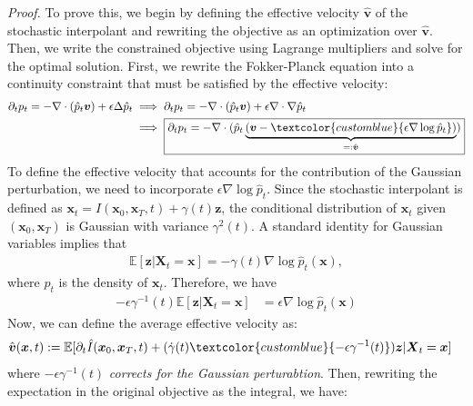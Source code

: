 \documentclass{article}
\newcommand{\bluetext}[1]{\textcolor{customblue}{#1}}
\begin{document}
\textit{Proof.} 
To prove this, we begin by defining the effective velocity $\hat{\boldsymbol{v}}$ of the stochastic interpolant and rewriting the objective as an optimization over $\hat{\boldsymbol{v}}$. Then, we write the constrained objective using Lagrange multipliers and solve for the optimal solution. First, we rewrite the Fokker-Planck equation into a continuity constraint that must be satisfied by the effective velocity:
\begin{align}
    \partial_tp_t=-\nabla \cdot(\hat{p}_t\boldsymbol{v})+\epsilon\Delta \hat{p}_t&\implies \partial_tp_t=-\nabla \cdot(\hat{p}_t\boldsymbol{v})+\epsilon\nabla \cdot\nabla  \hat{p}_t\nonumber\\
    &\implies\boxed{\partial_tp_t=-\nabla \cdot(\hat{p}_t\underbrace{(\boldsymbol{v}-\bluetext{\epsilon \nabla\log  \hat p_t})}_{=:\hat{\boldsymbol{v}}})}
\end{align}
To define the effective velocity that accounts for the contribution of the Gaussian perturbation, we need to incorporate $\epsilon \nabla\log  \hat p_t$. Since the stochastic interpolant is defined as $\boldsymbol{x}_t=I(\boldsymbol{x}_0, \boldsymbol{x}_T,t)+\gamma(t)\boldsymbol{z}$, the conditional distribution of $\boldsymbol{x}_t$ given $(\boldsymbol{x}_0, \boldsymbol{x}_T)$ is Gaussian with variance $\gamma^2(t)$. A standard identity for Gaussian variables implies that
\begin{align}
    \mathbb{E}[\boldsymbol{z} | \boldsymbol{X}_t = \boldsymbol{x}] = -\gamma(t) \nabla \log \hat p_t(\boldsymbol{x}),
\end{align}
where $\hat p_t$ is the density of $\boldsymbol{x}_t$. Therefore, we have
\begin{align}
    -\epsilon \gamma^{-1}(t)\mathbb{E}[\boldsymbol{z} | \boldsymbol{X}_t = \boldsymbol{x}]&= \epsilon \nabla \log \hat p_t(\boldsymbol{x})
\end{align}
Now, we can define the average effective velocity as:
\begin{align}
    \hat{\boldsymbol{v}}(\boldsymbol{x},t)&:=\mathbb{E}[\partial_t\hat{I}(\boldsymbol{x}_0, \boldsymbol{x}_T,t)+(\dot{\gamma}(t)\bluetext{-\epsilon\gamma^{-1}(t)})\boldsymbol{z}|\boldsymbol{X}_t=\boldsymbol{x}]
\end{align}
where $-\epsilon\gamma^{-1}(t)$ \textit{corrects for the Gaussian perturabtion}. Then, rewriting the expectation in the original objective as the integral, we have:
\end{document}
